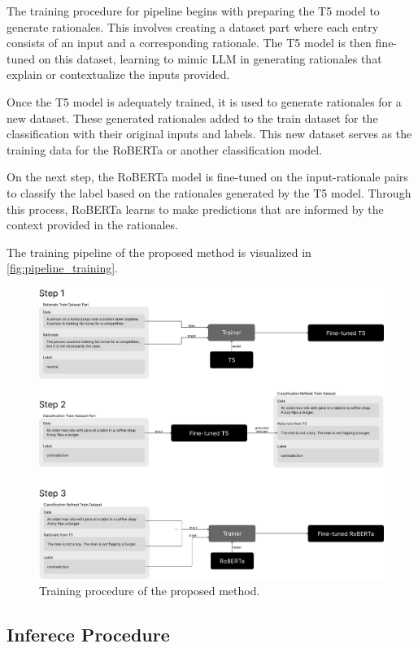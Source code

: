 The training procedure for pipeline begins with preparing the T5 model to generate rationales. This involves creating a dataset part where each entry consists of an input and a corresponding rationale. The T5 model is then fine-tuned on this dataset, learning to mimic LLM in generating rationales that explain or contextualize the inputs provided.

Once the T5 model is adequately trained, it is used to generate rationales for a new dataset. These generated rationales added to the train dataset for the classification with their original inputs and labels. This new dataset serves as the training data for the RoBERTa or another classification model.

On the next step, the RoBERTa model is fine-tuned on the input-rationale pairs to classify the label based on the rationales generated by the T5 model. Through this process, RoBERTa learns to make predictions that are informed by the context provided in the rationales.

The training pipeline of the proposed method is visualized in \autoref{fig:pipeline_training}.

\begin{figure}[hbt]
    \centering
    \includegraphics[width=\linewidth]{figs/pipeline_training.pdf}
    \caption{Training procedure of the proposed method.}
    \label{fig:pipeline_training}
\end{figure}

\subsection*{Inferece Procedure}

